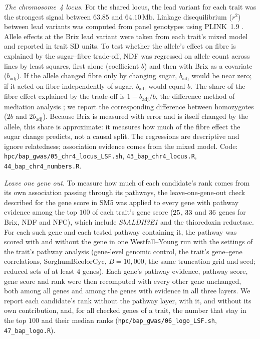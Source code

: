 \emph{The chromosome~4 locus.} For the shared locus, the lead variant for each trait was the strongest signal between $63.85$ and $64.10\,\mathrm{Mb}$. Linkage disequilibrium ($r^2$) between lead variants was computed from panel genotypes using PLINK~1.9 \citep{Chang2015PLINK}. Allele effects at the Brix lead variant were taken from each trait’s mixed model and reported in trait SD units. To test whether the allele’s effect on fibre is explained by the sugar–fibre trade-off, NDF was regressed on allele count across lines by least squares, first alone (coefficient $b$) and then with Brix as a covariate ($b_{\mathrm{adj}}$). If the allele changed fibre only by changing sugar, $b_{\mathrm{adj}}$ would be near zero; if it acted on fibre independently of sugar, $b_{\mathrm{adj}}$ would equal $b$. The share of the fibre effect explained by the trade-off is $1-b_{\mathrm{adj}}/b$, the difference method of mediation analysis \citep{VanderWeele2016Mediation}; we report the corresponding difference between homozygotes ($2b$ and $2b_{\mathrm{adj}}$). Because Brix is measured with error and is itself changed by the allele, this share is approximate: it measures how much of the fibre effect the sugar change predicts, not a causal split. The regressions are descriptive and ignore relatedness; association evidence comes from the mixed model. Code: \texttt{hpc/bap\_gwas/05\_chr4\_locus\_LSF.sh}, \texttt{43\_bap\_chr4\_locus.R}, \texttt{44\_bap\_chr4\_numbers.R}.

\emph{Leave one gene out.} To measure how much of each candidate's rank comes
from its own association passing through its pathways, the leave-one-gene-out
check described for the gene score in SM5 was applied to every gene with pathway evidence among the
top $100$ of each trait's gene score ($25$, $33$ and
$36$ genes for Brix, NDF and NFC), which include \textit{SbALDH3E1} and the thioredoxin reductase. For
each such gene and each tested pathway containing it, the pathway was scored
with and without the gene in one Westfall--Young run with the settings of the
trait's pathway analysis (gene-level genomic control, the trait's gene--gene
correlations, SorghumBicolorCyc, $B=10{,}000$, the same truncation grid and
seed; reduced sets of at least $4$ genes). Each gene's pathway evidence, pathway
score, gene score and rank were then recomputed with every other gene unchanged,
both among all genes and among the genes with evidence in all three layers. We
report each candidate's rank without the pathway layer, with it, and without
its own contribution, and, for all checked genes of a trait, the number that
stay in the top $100$ and their median ranks
(\texttt{hpc/bap\_gwas/06\_logo\_LSF.sh}, \texttt{47\_bap\_logo.R}).


